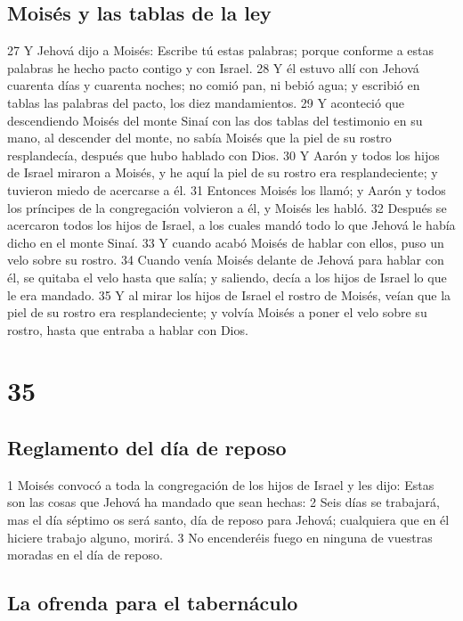 \section{Moisés y las tablas de la ley}

27 Y Jehová dijo a Moisés: Escribe tú estas palabras; porque conforme a estas palabras he hecho pacto contigo y con Israel.
28 Y él estuvo allí con Jehová cuarenta días y cuarenta noches; no comió pan, ni bebió agua; y escribió en tablas las palabras del pacto, los diez mandamientos.
29 Y aconteció que descendiendo Moisés del monte Sinaí con las dos tablas del testimonio en su mano, al descender del monte, no sabía Moisés que la piel de su rostro resplandecía, después que hubo hablado con Dios.
30 Y Aarón y todos los hijos de Israel miraron a Moisés, y he aquí la piel de su rostro era resplandeciente; y tuvieron miedo de acercarse a él.
31 Entonces Moisés los llamó; y Aarón y todos los príncipes de la congregación volvieron a él, y Moisés les habló.
32 Después se acercaron todos los hijos de Israel, a los cuales mandó todo lo que Jehová le había dicho en el monte Sinaí.
33 Y cuando acabó Moisés de hablar con ellos, puso un velo sobre su rostro.
34 Cuando venía Moisés delante de Jehová para hablar con él, se quitaba el velo hasta que salía; y saliendo, decía a los hijos de Israel lo que le era mandado.
35 Y al mirar los hijos de Israel el rostro de Moisés, veían que la piel de su rostro era resplandeciente; y volvía Moisés a poner el velo sobre su rostro, hasta que entraba a hablar con Dios.

\chapter{35}

\section{Reglamento del día de reposo}

1 Moisés convocó a toda la congregación de los hijos de Israel y les dijo: Estas son las cosas que Jehová ha mandado que sean hechas:
2 Seis días se trabajará, mas el día séptimo os será santo, día de reposo para Jehová; cualquiera que en él hiciere trabajo alguno, morirá.
3 No encenderéis fuego en ninguna de vuestras moradas en el día de reposo.

\section{La ofrenda para el tabernáculo}

